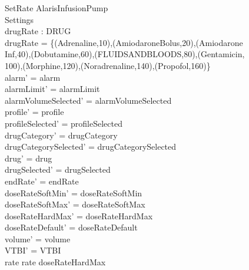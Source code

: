 \begin{schema}{SetRate}
	\Delta AlarisInfusionPump\\
	 Settings\\
	drugRate : DRUG \rel \nat\\
	\where
	drugRate = \{(Adrenaline,10),(AmiodaroneBolus,20),(Amiodarone\\
	Inf,40),(Dobutamine,60),(FLUIDSANDBLOODS,80),(Gentamicin,\\
	100),(Morphine,120),(Noradrenaline,140),(Propofol,160)\}\\
	alarm' = alarm\\
	alarmLimit' = alarmLimit\\
	alarmVolumeSelected' = alarmVolumeSelected\\
	profile' = profile\\
	profileSelected' = profileSelected\\
	drugCategory' = drugCategory\\ 
	drugCategorySelected' = drugCategorySelected\\
	drug' = drug\\ 
	drugSelected' = drugSelected\\
	endRate' = endRate\\
	doseRateSoftMin' = doseRateSoftMin\\
	doseRateSoftMax' = doseRateSoftMax\\
	doseRateHardMax' = doseRateHardMax\\
	doseRateDefault' = doseRateDefault\\
	\pagebreak
	volume' = volume\\
	VTBI' = VTBI\\
	rate  \land rate \leq doseRateHardMax\\

\end{schema}

